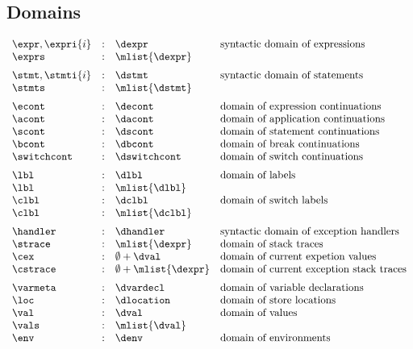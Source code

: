 \documentclass{article}
\begin{document}
\subsection{Domains}
\[
\begin{array}{lcll}

\expr, \expri{i} & : & \dexpr & \textrm{syntactic domain of expressions}\\
\exprs & : & \mlist{\dexpr}  & \textrm{}\\[2mm]

\stmt, \stmti{i} & : & \dstmt & \textrm{syntactic domain of statements}\\
\stmts & : & \mlist{\dstmt}  & \textrm{}\\[2mm]

\econt & : & \decont & \textrm{domain of expression continuations}\\
\acont & : & \dacont & \textrm{domain of application continuations}\\
\scont & : & \dscont & \textrm{domain of statement continuations}\\
\bcont & : & \dbcont & \textrm{domain of break continuations}\\
\switchcont & : & \dswitchcont & \textrm{domain of switch continuations}\\[2mm]

\lbl & : & \dlbl & \textrm{domain of labels}\\
\lbl & : & \mlist{\dlbl} \\
\clbl & : & \dclbl & \textrm{domain of switch labels}\\
\clbl & : & \mlist{\dclbl} \\[2mm]

\handler & : & \dhandler & \textrm{syntactic domain of exception handlers} \\
\strace & : & \mlist{\dexpr} & \textrm{domain of stack traces}\\
\cex & : &  \emptyset + \dval & \textrm{domain of current expetion values}\\
\cstrace & : & \emptyset + \mlist{\dexpr} & \textrm{domain of current exception stack traces}\\[2mm]

\varmeta & : & \dvardecl & \textrm{domain of variable declarations}\\
\loc & : & \dlocation & \textrm{domain of store locations}\\
\val & : & \dval & \textrm{domain of values} \\ 
\vals & : & \mlist{\dval}\\
\env & : & \denv & \textrm{domain of environments}  

\end{array}
\]
\end{document}
